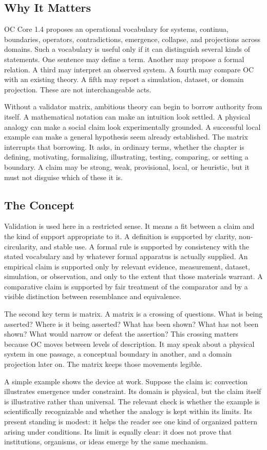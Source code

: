 \documentclass[11pt,a4paper,openany]{book}
\begin{document}
\subsection{Why It Matters}
OC Core 1.4 proposes an operational vocabulary for systems, continua, boundaries, operators, contradictions, emergence, collapse, and projections across domains. Such a vocabulary is useful only if it can distinguish several kinds of statements. One sentence may define a term. Another may propose a formal relation. A third may interpret an observed system. A fourth may compare OC with an existing theory. A fifth may report a simulation, dataset, or domain projection. These are not interchangeable acts. \cite{landau_stat_physics,prigogine_dissipative}\par
Without a validator matrix, ambitious theory can begin to borrow authority from itself. A mathematical notation can make an intuition look settled. A physical analogy can make a social claim look experimentally grounded. A successful local example can make a general hypothesis seem already established. The matrix interrupts that borrowing. It asks, in ordinary terms, whether the chapter is defining, motivating, formalizing, illustrating, testing, comparing, or setting a boundary. A claim may be strong, weak, provisional, local, or heuristic, but it must not disguise which of these it is.\par
\subsection{The Concept}
Validation is used here in a restricted sense. It means a fit between a claim and the kind of support appropriate to it. A definition is supported by clarity, non-circularity, and stable use. A formal rule is supported by consistency with the stated vocabulary and by whatever formal apparatus is actually supplied. An empirical claim is supported only by relevant evidence, measurement, dataset, simulation, or observation, and only to the extent that those materials warrant. A comparative claim is supported by fair treatment of the comparator and by a visible distinction between resemblance and equivalence. \cite{landau_stat_physics,prigogine_dissipative}\par
The second key term is matrix. A matrix is a crossing of questions. What is being asserted? Where is it being asserted? What has been shown? What has not been shown? What would narrow or defeat the assertion? This crossing matters because OC moves between levels of description. It may speak about a physical system in one passage, a conceptual boundary in another, and a domain projection later on. The matrix keeps those movements legible.\par
A simple example shows the device at work. Suppose the claim is: convection illustrates emergence under constraint. Its domain is physical, but the claim itself is illustrative rather than universal. The relevant check is whether the example is scientifically recognizable and whether the analogy is kept within its limits. Its present standing is modest: it helps the reader see one kind of organized pattern arising under conditions. Its limit is equally clear: it does not prove that institutions, organisms, or ideas emerge by the same mechanism.\par
\end{document}
